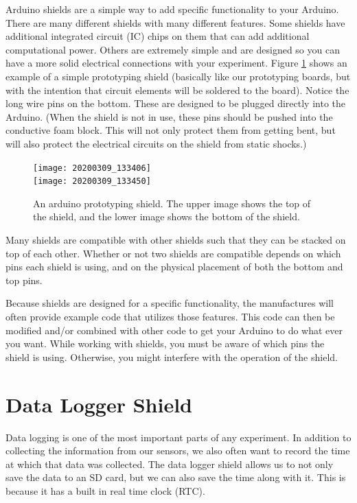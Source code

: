 Arduino shields are a simple way to add specific functionality to your Arduino. 
There are many different shields with many different features. Some shields 
have additional integrated circuit (IC) chips on them that can add additional 
computational power.  Others are extremely simple and are designed so you can 
have a more solid electrical connections with your experiment.  
Figure \ref{fig:shield} shows an example of a simple prototyping shield 
(basically like our prototyping boards, but with the intention that circuit 
elements will be soldered to the board).
Notice the long wire pins on the bottom. These are designed to be plugged 
directly into the Arduino. (When the shield is not in use, these pins should 
be pushed into the conductive foam block. This will not only protect them from 
getting bent, but will also protect the electrical circuits on the shield from 
static shocks.)
\begin{figure}[htbp!] 
	\centering
	\texttt{[image: 20200309\_133406]}\\
	\texttt{[image: 20200309\_133450]}
	\caption[An Arduino prototyping shield]
	{An arduino prototyping shield. The upper image shows the top of the
	shield, and the lower image shows the bottom of the shield.}
	\label{fig:shield}
\end{figure}
	
Many shields are compatible with other shields such that they can be stacked 
on top of each other. Whether or not two shields are compatible depends on 
which pins each shield is using, and on the physical placement of both the 
bottom and top pins.
	
Because shields are designed for a specific functionality, the manufactures 
will often provide example code that utilizes those features. This code can 
then be modified and/or combined with other code to get your Arduino to do what 
ever you want. While working with shields, you must be aware of which pins the 
shield is using. Otherwise, you might interfere with the operation of the 
shield.

\section{Data Logger Shield}
Data logging is one of the most important parts of any experiment. 
In addition to collecting the information from our sensors, we also often want
to record the time at which that data was collected.
The data logger shield allows us to not only save the data to an SD card, but 
we can also save the time along with it. This is because it has a built in 
real time clock (RTC). 
	
